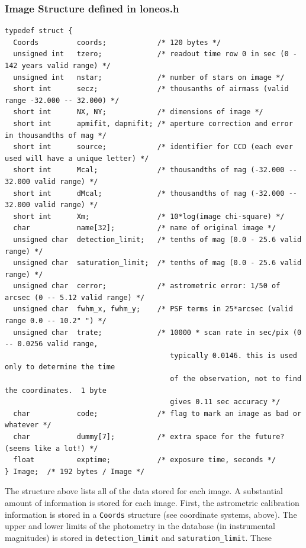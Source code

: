 \documentclass{article}
\begin{document}
\subsubsection*{Image Structure defined in loneos.h}
{\small
\begin{verbatim}
typedef struct {
  Coords         coords;            /* 120 bytes */
  unsigned int   tzero;             /* readout time row 0 in sec (0 - 142 years valid range) */
  unsigned int   nstar;             /* number of stars on image */
  short int      secz;              /* thousanths of airmass (valid range -32.000 -- 32.000) */
  short int      NX, NY;            /* dimensions of image */
  short int      apmifit, dapmifit; /* aperture correction and error in thousandths of mag */
  short int      source;            /* identifier for CCD (each ever used will have a unique letter) */
  short int      Mcal;              /* thousandths of mag (-32.000 -- 32.000 valid range) */
  short int      dMcal;             /* thousandths of mag (-32.000 -- 32.000 valid range) */
  short int      Xm;                /* 10*log(image chi-square) */
  char           name[32];          /* name of original image */
  unsigned char  detection_limit;   /* tenths of mag (0.0 - 25.6 valid range) */
  unsigned char  saturation_limit;  /* tenths of mag (0.0 - 25.6 valid range) */
  unsigned char  cerror;            /* astrometric error: 1/50 of arcsec (0 -- 5.12 valid range) */
  unsigned char  fwhm_x, fwhm_y;    /* PSF terms in 25*arcsec (valid range 0.0 -- 10.2" ") */
  unsigned char  trate;             /* 10000 * scan rate in sec/pix (0 -- 0.0256 valid range, 
                                       typically 0.0146. this is used only to determine the time
                                       of the observation, not to find the coordinates.  1 byte
                                       gives 0.11 sec accuracy */
  char           code;              /* flag to mark an image as bad or whatever */
  char           dummy[7];          /* extra space for the future?  (seems like a lot!) */
  float          exptime;           /* exposure time, seconds */
} Image;  /* 192 bytes / Image */
\end{verbatim}}
The structure above lists all of the data stored for each image.  A
substantial amount of information is stored for each image.  First,
the astrometric calibration information is stored in a {\tt Coords}
structure (see coordinate systems, above).  The upper and lower limits
of the photometry in the database (in instrumental magnitudes) is
stored in {\tt detection\_limit} and {\tt saturation\_limit}.  These
\end{document}
